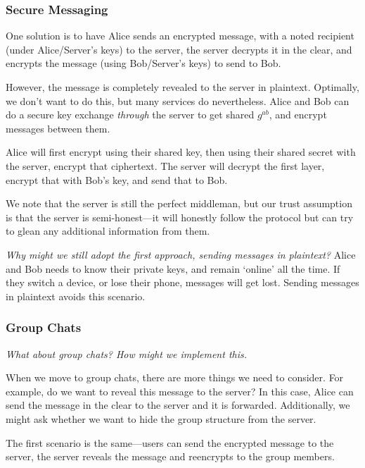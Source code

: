 \subsubsection{Secure Messaging}\label{sec:feb23-secure-messaging}

One solution is to have Alice sends an encrypted message, with a noted recipient (under Alice/Server's keys) to the server, the server decrypts it in the clear, and encrypts the message (using Bob/Server's keys) to send to Bob.


However, the message is completely revealed to the server in plaintext. Optimally, we don't want to do this, but many services do nevertheless. Alice and Bob can do a secure key exchange \emph{through} the server to get shared $g^{ab}$, and encrypt messages between them.

Alice will first encrypt using their shared key, then using their shared secret with the server, encrypt that ciphertext. The server will decrypt the first layer, encrypt that with Bob's key, and send that to Bob.

We note that the server is still the perfect middleman, but our trust assumption is that the server is semi-honest---it will honestly follow the protocol but can try to glean any additional information from them.

\emph{Why might we still adopt the first approach, sending messages in plaintext?} Alice and Bob needs to know their private keys, and remain `online' all the time. If they switch a device, or lose their phone, messages will get lost. Sending messages in plaintext avoids this scenario.

\subsubsection{Group Chats}
\emph{What about group chats? How might we implement this.}

When we move to group chats, there are more things we need to consider. For example, do we want to reveal this message to the server? In this case, Alice can send the message in the clear to the server and it is forwarded. Additionally, we might ask whether we want to hide the group structure from the server.


The first scenario is the same---users can send the encrypted message to the server, the server reveals the message and reencrypts to the group members.

